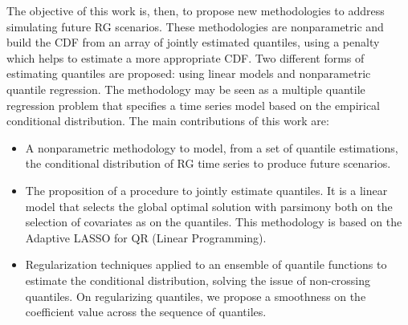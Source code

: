 

 
The objective of this work is, then, to propose new methodologies to address simulating future RG scenarios. These methodologies are nonparametric and build the CDF from an array of jointly estimated quantiles, using a penalty which helps to estimate a more appropriate CDF. Two different forms of estimating quantiles are proposed: using linear models and nonparametric quantile regression. The methodology may be seen as a multiple quantile regression problem that specifies a time series model based on the empirical conditional distribution. The main contributions of this work are:
\begin{itemize}
	\item A nonparametric methodology to model, from a set of quantile estimations, the conditional distribution of RG time series to produce future scenarios.
	
	\item The proposition of a procedure to jointly estimate quantiles. It is a linear model that selects the global optimal solution with parsimony both on the selection of covariates as on the quantiles. This methodology is based on the Adaptive LASSO for QR (Linear Programming). 
	
	\item Regularization techniques applied to an ensemble of quantile functions to estimate the conditional distribution, solving the issue of non-crossing quantiles. On regularizing quantiles, we propose a smoothness on the coefficient value across the sequence of quantiles.
	
\end{itemize}



